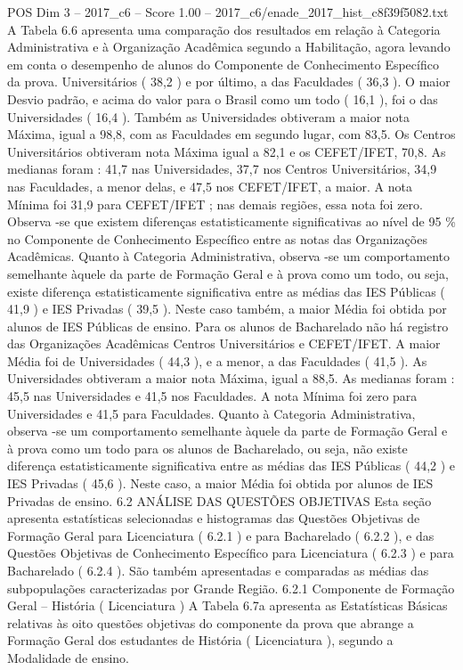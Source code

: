 \begin{textsample}{POS Dim 3 – 2017\_c6 – Score 1.00 – 2017\_c6/enade\_2017\_hist\_c8f39f5082.txt}
A Tabela 6.6 apresenta uma comparação dos resultados em relação à Categoria Administrativa e à Organização Acadêmica segundo a Habilitação, agora levando em conta o desempenho de alunos do Componente de Conhecimento Específico da prova.
Universitários ( 38,2 ) e por último, a das Faculdades ( 36,3 ).
O maior Desvio padrão, e acima do valor para o Brasil como um todo ( 16,1 ), foi o das Universidades ( 16,4 ).
Também as Universidades obtiveram a maior nota Máxima, igual a 98,8, com as Faculdades em segundo lugar, com 83,5.
Os Centros Universitários obtiveram nota Máxima igual a 82,1 e os CEFET/IFET, 70,8.
As medianas foram : 41,7 nas Universidades, 37,7 nos Centros Universitários, 34,9 nas Faculdades, a menor delas, e 47,5 nos CEFET/IFET, a maior.
A nota Mínima foi 31,9 para CEFET/IFET ; nas demais regiões, essa nota foi zero.
Observa -se que existem diferenças estatisticamente significativas ao nível de 95 \% no Componente de Conhecimento Específico entre as notas das Organizações Acadêmicas.
Quanto à Categoria Administrativa, observa -se um comportamento semelhante àquele da parte de Formação Geral e à prova como um todo, ou seja, existe diferença estatisticamente significativa entre as médias das IES Públicas ( 41,9 ) e IES Privadas ( 39,5 ).
Neste caso também, a maior Média foi obtida por alunos de IES Públicas de ensino.
Para os alunos de Bacharelado não há registro das Organizações Acadêmicas Centros Universitários e CEFET/IFET.
A maior Média foi de Universidades ( 44,3 ), e a menor, a das Faculdades ( 41,5 ).
As Universidades obtiveram a maior nota Máxima, igual a 88,5.
As medianas foram : 45,5 nas Universidades e 41,5 nos Faculdades.
A nota Mínima foi zero para Universidades e 41,5 para Faculdades.
Quanto à Categoria Administrativa, observa -se um comportamento semelhante àquele da parte de Formação Geral e à prova como um todo para os alunos de Bacharelado, ou seja, não existe diferença estatisticamente significativa entre as médias das IES Públicas ( 44,2 ) e IES Privadas ( 45,6 ).
Neste caso, a maior Média foi obtida por alunos de IES Privadas de ensino. 6.2 ANÁLISE DAS QUESTÕES OBJETIVAS Esta seção apresenta estatísticas selecionadas e histogramas das Questões Objetivas de Formação Geral para Licenciatura ( 6.2.1 ) e para Bacharelado ( 6.2.2 ), e das Questões Objetivas de Conhecimento Específico para Licenciatura ( 6.2.3 ) e para Bacharelado ( 6.2.4 ).
São também apresentadas e comparadas as médias das subpopulações caracterizadas por Grande Região. 6.2.1 Componente de Formação Geral – História ( Licenciatura ) A Tabela 6.7a apresenta as Estatísticas Básicas relativas às oito questões objetivas do componente da prova que abrange a Formação Geral dos estudantes de História ( Licenciatura ), segundo a Modalidade de ensino.

\end{textsample}
